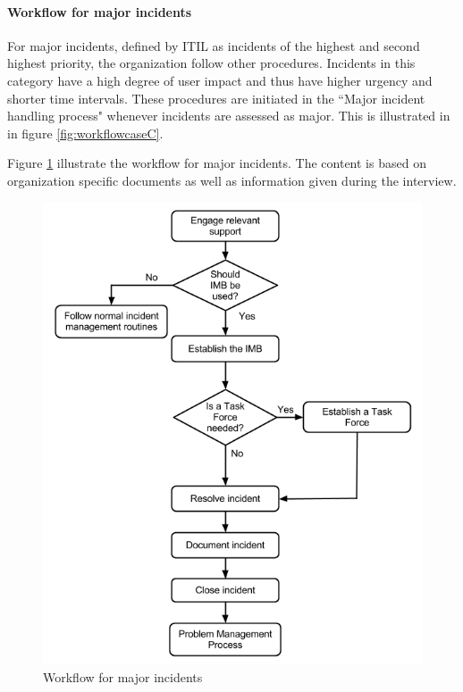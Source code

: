 \paragraph{Workflow for major incidents}
For major incidents, defined by ITIL as incidents of the highest and second highest priority, the organization follow other procedures. Incidents in this category have a high degree of user impact and thus have higher urgency and shorter time intervals. These procedures are initiated in the ``Major incident handling process" whenever incidents are assessed as major. This is illustrated in in figure \ref{fig:workflowcaseC}.  

Figure \ref{fig:workflowcaseCmajor} illustrate the workflow for major incidents. The content is based on organization specific documents as well as information given during the interview.

\begin{figure}[H]
\hspace{-1.1cm}\includegraphics[scale=0.53]{WorkflowcaseCMAJOR.png}
\caption[Workflow for major incidents, Case B]{Workflow for major incidents}
\label{fig:workflowcaseCmajor}
\end{figure}

